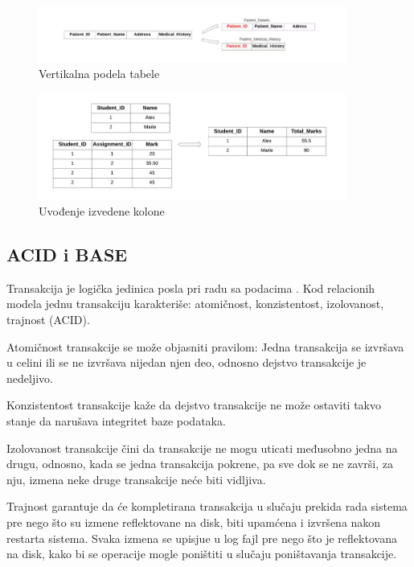 \documentclass[12pt,oneside]{memoir}
\begin{document}
\begin{figure}[!ht]
  \centering
  \includegraphics[width=0.9\textwidth]{denormalizacija3.png}
  \caption{Vertikalna podela tabele}
  \label{fig:grafikon}
\end{figure}

\begin{figure}[!ht]
  \centering
  \includegraphics[width=0.9\textwidth]{denormalizacija4.png}
  \caption{Uvođenje izvedene kolone}
  \label{fig:grafikon}
\end{figure}
\pagebreak

\subsection{ACID i BASE}

Transakcija je logička jedinica posla pri radu sa podacima \cite{URBP}. Kod relacionih modela jednu transakciju karakteriše: atomičnost, konzistentost, izolovanost, trajnost (ACID).

Atomičnost transakcije se može objasniti pravilom: Jedna transakcija se izvršava u celini ili se ne izvršava nijedan njen deo, odnosno dejstvo transakcije je nedeljivo. 

Konzistentost transakcije kaže da dejstvo transakcije ne može ostaviti takvo stanje da narušava integritet baze podataka.

Izolovanost transakcije čini da transakcije ne mogu uticati međusobno jedna na drugu, odnosno, kada se jedna transakcija pokrene, pa sve dok se ne završi, za nju, izmena neke druge transakcije neće biti vidljiva.

Trajnost garantuje da će kompletirana transakcija u slučaju prekida rada sistema pre nego što su izmene reflektovane na disk, biti upamćena i izvršena nakon restarta sistema. Svaka izmena se upisjue u log fajl pre nego što je reflektovana na disk, kako bi se operacije mogle poništiti u slučaju poništavanja transakcije.
\end{document}
